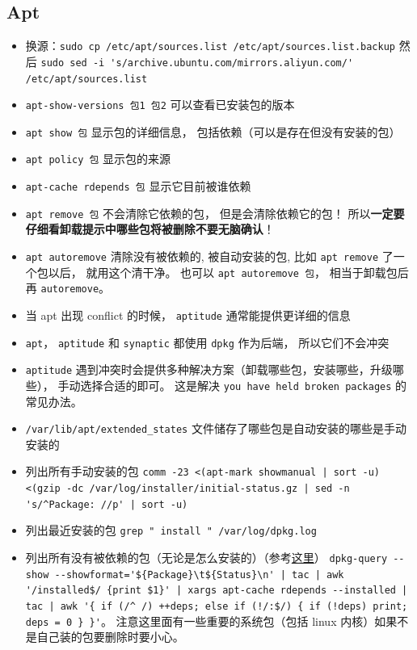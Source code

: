 
\begin{issues}
\issueDraft
\end{issues}

\subsection{Apt}

\begin{itemize}
\item 换源：\verb`sudo cp /etc/apt/sources.list /etc/apt/sources.list.backup` 然后 \verb`sudo sed -i 's/archive.ubuntu.com/mirrors.aliyun.com/' /etc/apt/sources.list`
\item \verb`apt-show-versions 包1 包2` 可以查看已安装包的版本
\item \verb`apt show 包` 显示包的详细信息， 包括依赖（可以是存在但没有安装的包）
\item \verb`apt policy 包` 显示包的来源
\item \verb`apt-cache rdepends 包` 显示它目前被谁依赖
\item \verb`apt remove 包` 不会清除它依赖的包， 但是会清除依赖它的包！ 所以\textbf{一定要仔细看卸载提示中哪些包将被删除不要无脑确认}！
\item \verb`apt autoremove` 清除没有被依赖的, 被自动安装的包, 比如 \verb`apt remove` 了一个包以后， 就用这个清干净。 也可以 \verb`apt autoremove 包`， 相当于卸载包后再 \verb`autoremove`。
\item 当 apt 出现 conflict 的时候， \verb`aptitude` 通常能提供更详细的信息
\item \verb`apt`， \verb`aptitude` 和 \verb`synaptic` 都使用 \verb`dpkg` 作为后端， 所以它们不会冲突
\item \verb`aptitude` 遇到冲突时会提供多种解决方案（卸载哪些包，安装哪些，升级哪些）， 手动选择合适的即可。 这是解决 \verb`you have held broken packages` 的常见办法。
\item \verb`/var/lib/apt/extended_states` 文件储存了哪些包是自动安装的哪些是手动安装的
\item 列出所有手动安装的包 \verb`comm -23 <(apt-mark showmanual | sort -u) <(gzip -dc /var/log/installer/initial-status.gz | sed -n 's/^Package: //p' | sort -u)`
\item 列出最近安装的包 \verb`grep " install " /var/log/dpkg.log`
\item 列出所有没有被依赖的包（无论是怎么安装的）（参考\href{https://askubuntu.com/questions/1114733/how-do-i-list-all-packages-that-no-package-depends-on}{这里}） \verb`dpkg-query --show --showformat='${Package}\t${Status}\n' | tac | awk '/installed$/ {print $1}' | xargs apt-cache rdepends --installed | tac | awk '{ if (/^ /) ++deps; else if (!/:$/) { if (!deps) print; deps = 0 } }'`。 注意这里面有一些重要的系统包（包括 linux 内核）如果不是自己装的包要删除时要小心。

\end{itemize}
